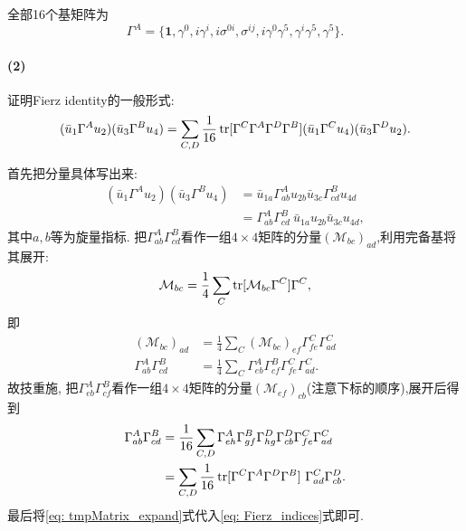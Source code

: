 全部16个基矩阵为
\begin{equation}
  \Gamma^A = \bigl\{\mathbf{1}, \gamma^0, i\gamma^i, i\sigma^{0i}, \sigma^{ij}, i\gamma^0\gamma^5, \gamma^i\gamma^5, \gamma^5\bigr\}.
\end{equation}

\paragraph*{(2)}
证明Fierz identity的一般形式:
\begin{equation}
  (\bar{u}_1\Gamma^A u_2)(\bar{u}_3\Gamma^B u_4) = \sum_{C,D} \frac{1}{16} \operatorname{tr}[\Gamma^C \Gamma^A \Gamma^D \Gamma^B](\bar{u}_1\Gamma^C u_4)(\bar{u}_3\Gamma^D u_2).
\end{equation}

首先把分量具体写出来:
\begin{equation}\label{eq: Fierz_indices}
  \begin{aligned}
    (\bar{u}_1\Gamma^A u_2)(\bar{u}_3\Gamma^B u_4) & = \bar{u}_{1a}\Gamma^A_{ab} u_{2b}\bar{u}_{3c}\Gamma^B_{cd} u_{4d}  \\
                                                   & = \Gamma^A_{ab}\Gamma^B_{cd}\ \bar{u}_{1a}u_{2b}\bar{u}_{3c}u_{4d},
  \end{aligned}
\end{equation}
其中$a,b$等为旋量指标.
把$\Gamma^A_{ab}\Gamma^B_{cd}$看作一组$4\times 4$矩阵的分量$(\mathcal{M}_{bc})_{ad}$,利用完备基将其展开:
\begin{equation}
  \mathcal{M}_{bc} = \frac{1}{4} \sum_C\operatorname{tr}[\mathcal{M}_{bc}\Gamma^C]\Gamma^C,
\end{equation}
即
\begin{equation}
  \begin{aligned}
    (\mathcal{M}_{bc})_{ad}    & = \frac{1}{4} \sum_C (\mathcal{M}_{bc})_{ef}\Gamma^C_{fe} \Gamma^C_{ad}    \\
    \Gamma^A_{ab}\Gamma^B_{cd} & = \frac{1}{4} \sum_C \Gamma^A_{eb}\Gamma^B_{cf}\Gamma^C_{fe}\Gamma^C_{ad}.
  \end{aligned}
\end{equation}
故技重施, 把$\Gamma^A_{eb}\Gamma^B_{cf}$看作一组$4\times 4$矩阵的分量$(\mathcal{M}_{ef})_{cb}$(注意下标的顺序),展开后得到
\begin{equation}\label{eq: tmpMatrix_expand}
  \begin{aligned}
    \Gamma^A_{ab}\Gamma^B_{cd} & = \frac{1}{16} \sum_{C,D} \Gamma^A_{eh}\Gamma^B_{gf}\Gamma^D_{hg}\Gamma^D_{cb}\Gamma^C_{fe}\Gamma^C_{ad} \\
                               & = \sum_{C,D} \frac{1}{16} \operatorname{tr}[\Gamma^C\Gamma^A\Gamma^D\Gamma^B]\ \Gamma^C_{ad}\Gamma^D_{cb}.
  \end{aligned}
\end{equation}
最后将\eqref{eq: tmpMatrix_expand}式代入\eqref{eq: Fierz_indices}式即可.

